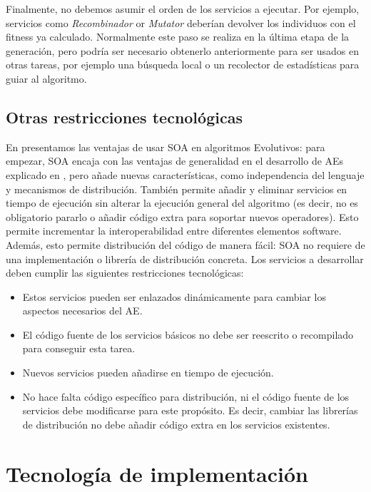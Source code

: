 \documentclass[runningheads]{llncs}
\begin{document}
Finalmente, no debemos asumir el orden de los servicios a ejecutar. Por ejemplo, servicios como {\em Recombinador} or {\em Mutator} deberían devolver los individuos con el fitness ya calculado. Normalmente este paso se realiza en la última etapa de la generación, pero podría ser necesario obtenerlo anteriormente para ser usados en otras tareas, por ejemplo una búsqueda local o un recolector de estadísticas para guiar al algoritmo.

\subsection{Otras restricciones tecnológicas}

En \cite{OSGILIATH} presentamos las ventajas de usar SOA en algoritmos Evolutivos: para empezar, SOA encaja con las ventajas de generalidad en el desarrollo de AEs explicado en \cite{GENERICITY05}, pero añade nuevas características, como independencia del lenguaje y mecanismos de distribución. También permite añadir y eliminar servicios en tiempo de ejecución sin alterar la ejecución general del algoritmo (es decir, no es obligatorio pararlo o añadir código extra para soportar nuevos operadores). Esto permite incrementar la interoperabilidad entre diferentes elementos software. Además, esto permite distribución del código de manera fácil: SOA no requiere de una implementación o librería de distribución concreta. Los servicios a desarrollar deben cumplir las siguientes restricciones tecnológicas:
\begin{itemize}
\item Estos servicios pueden ser enlazados dinámicamente para cambiar los aspectos necesarios del AE.
\item El código fuente de los servicios básicos no debe ser reescrito o recompilado para conseguir esta tarea.
\item Nuevos servicios pueden añadirse en tiempo de ejecución.
\item No hace falta código específico para distribución, ni el código fuente de los servicios debe modificarse para este propósito. Es decir, cambiar las librerías de distribución no debe añadir código extra en los servicios existentes.
\end{itemize}

\section{Tecnología de implementación}
\label{sec:technology}
\end{document}

